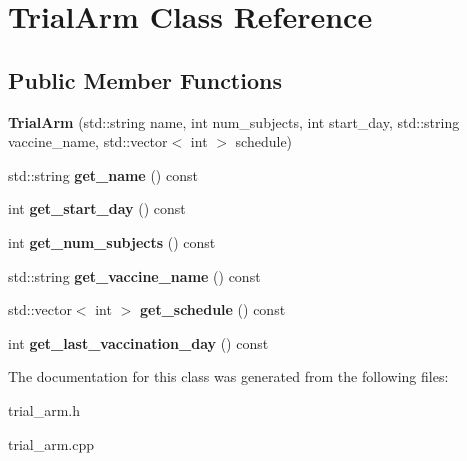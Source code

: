 \hypertarget{class_trial_arm}{}\section{Trial\+Arm Class Reference}
\label{class_trial_arm}
\subsection*{Public Member Functions}
\begin{DoxyCompactItemize}
\item 
\mbox{\label{class_trial_arm_a176b7556b310a3b266a87f8c5970535e}} 
{\bfseries Trial\+Arm} (std\+::string name, int num\+\_\+subjects, int start\+\_\+day, std\+::string vaccine\+\_\+name, std\+::vector$<$ int $>$ schedule)
\item 
\mbox{\label{class_trial_arm_ab9dcfaaf083ba8031cf4992e55c23a66}} 
std\+::string {\bfseries get\+\_\+name} () const
\item 
\mbox{\label{class_trial_arm_a6d9431511351bab3fc0e38e908063a62}} 
int {\bfseries get\+\_\+start\+\_\+day} () const
\item 
\mbox{\label{class_trial_arm_a98e7b7e834cc526e27f44e33ddfbbe70}} 
int {\bfseries get\+\_\+num\+\_\+subjects} () const
\item 
\mbox{\label{class_trial_arm_a15f150e07566e529fc671b487496c769}} 
std\+::string {\bfseries get\+\_\+vaccine\+\_\+name} () const
\item 
\mbox{\label{class_trial_arm_ace56fdd6bdc3c4d67cbf02ad134de0fe}} 
std\+::vector$<$ int $>$ {\bfseries get\+\_\+schedule} () const
\item 
\mbox{\label{class_trial_arm_a485933fa6daabb8cb6b99343a69ad4e7}} 
int {\bfseries get\+\_\+last\+\_\+vaccination\+\_\+day} () const
\end{DoxyCompactItemize}


The documentation for this class was generated from the following files\+:\begin{DoxyCompactItemize}
\item 
trial\+\_\+arm.\+h\item 
trial\+\_\+arm.\+cpp\end{DoxyCompactItemize}
